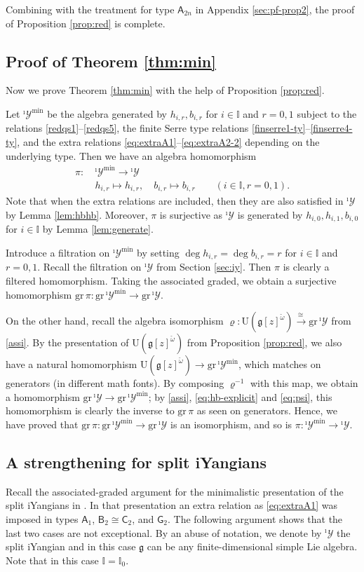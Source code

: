 \documentclass[11pt,reqno]{amsart}
\numberwithin{equation}{section}
\theoremstyle{definition}
\theoremstyle{remark}
\newcommand{\g}{\mathfrak{g}}
\newcommand{\gr}{{\mathrm{gr}}}
\newcommand{\I}{{\mathbb I}}
\newcommand{\Yi}{{^\imath\mathscr{Y}}}
\begin{document}
Combining with the treatment for type $\mathsf A_{2n}$ in Appendix \ref{sec:pf-prop2}, the proof of Proposition \ref{prop:red} is complete.


\subsection{Proof of Theorem \ref{thm:min}}\label{sec:pfthmA}
Now we prove Theorem \ref{thm:min} with the help of Proposition \ref{prop:red}.

Let $\Yi^{\min}$ be the algebra generated by $h_{i,r},b_{i,r}$ for $i\in \I$ and $r=0,1$ subject to the relations \eqref{redqs1}--\eqref{redqs5}, the finite Serre type relations \eqref{finserre1-ty}--\eqref{finserre4-ty}, and the extra relations \eqref{eq:extraA1}--\eqref{eq:extraA2-2} depending on the underlying type. Then we have an algebra homomorphism
\begin{align*}
\pi:&~ \Yi^{\min}\to \Yi\\
&~h_{i,r}\mapsto h_{i,r},\quad b_{i,r}\mapsto b_{i,r} \qquad (i\in \I,r=0,1).
\end{align*}
Note that when the extra relations are included, then they are also satisfied in $\Yi$ by Lemma \ref{lem:hbhb}.
Moreover, $\pi$ is surjective as $\Yi$ is generated by $h_{i,0},h_{i,1},b_{i,0}$ for $i\in \I$ by Lemma \ref{lem:generate}. 

Introduce a filtration on $\Yi^{\min}$  by setting $\deg h_{i,r}=\deg b_{i,r}=r$ for $i\in \I$ and $r=0,1$. Recall the filtration on $\Yi$ from Section \ref{sec:iy}. Then $\pi$ is clearly a filtered homomorphism. Taking the associated graded, we obtain a surjective homomorphism $\gr\,\pi:\gr\,\Yi^{\min}\to\gr\,\Yi$.

On the other hand, recall the algebra isomorphism $\varrho: \mathrm{U}(\g[z]^{\check\omega})\stackrel{\cong\,}{\longrightarrow} \mathrm{gr}\,\Yi$ from \eqref{assi}. By the presentation of $\mathrm{U}(\g[z]^{\check\omega})$ from Proposition \ref{prop:red}, we also have a natural homomorphism $\mathrm{U}(\g[z]^{\check\omega})\to \gr\,\Yi^{\min}$, which matches on generators (in different math fonts). By composing  $\varrho^{-1}$ with this map, we obtain a homomorphism $\gr \,\Yi\to \gr\,\Yi^{\min}$; by \eqref{assi}, \eqref{eq:hb-explicit} and \eqref{eq:psi}, this homomorphism is clearly the inverse to $\gr\,\pi$ as seen on generators. Hence, we have proved that $\gr\,\pi:\gr\,\Yi^{\min}\to\gr\,\Yi$ is an isomorphism, and so is $\pi:\Yi^{\min}\to \Yi$.

\subsection{A strengthening for split iYangians}\label{ssec:split-strengthening}
Recall the associated-graded argument for
the minimalistic presentation of the split iYangians in  \cite[Theorem 3.1]{Lu26min}. In that
presentation an extra relation as \eqref{eq:extraA1} was imposed in types
$\mathsf A_1$, $\mathsf B_2\cong\mathsf C_2$, and $\mathsf G_2$.
The following argument shows that the last two cases are not exceptional. By an abuse of notation, we denote by 
$\Yi$ the split iYangian and in this case $\g$ can be any finite-dimensional simple Lie algebra. Note that in this case $\I=\I_0$.
\end{document}
